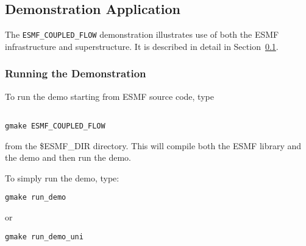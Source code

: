 \subsection{Demonstration Application}
\label{sec:demo}

The {\tt ESMF\_COUPLED\_FLOW} demonstration illustrates use of both the
ESMF infrastructure and superstructure.  It is described in detail in 
Section~\ref{sec:demo}.

\subsubsection{Running the Demonstration}

To run the demo starting from ESMF source code, type 
\begin{verbatim}

gmake ESMF_COUPLED_FLOW

\end{verbatim}
from the \$ESMF\_DIR directory.  This will compile both the 
ESMF library and the demo and then run the demo.

To simply run the demo, type:

\begin{verbatim}
gmake run_demo
\end{verbatim}
or
\begin{verbatim}
gmake run_demo_uni
\end{verbatim}




